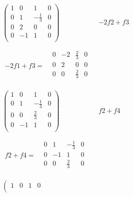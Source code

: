 \[
    \begin{aligned}
        \left(
            \begin{array}{ccc|c}
                1 & 0 & 1 & 0 \\
                0 & 1 & -\frac{1}{3} & 0 \\
                0 & 2 & 0 & 0 \\
                0 & -1 & 1 & 0 \\
            \end{array}
        \right)
        &-2f2+f3 \\ \\
        \begin{aligned}
            -2f1+f3=
            &\begin{array}{ccc|c}
                0 & -2 & \frac{2}{3} & 0 \\
                0 & 2 & 0 & 0 \\
                \hline
                0 & 0 & \frac{2}{3} & 0 \\
            \end{array}
        \end{aligned} \\ \\
        \left(
            \begin{array}{ccc|c}
                1 & 0 & 1 & 0 \\
                0 & 1 & -\frac{1}{3} & 0 \\
                0 & 0 & \frac{2}{3} & 0 \\
                0 & -1 & 1 & 0 \\
            \end{array}
        \right)
        &f2+f4 \\ \\
        \begin{aligned}
            f2+f4=
            &\begin{array}{ccc|c}
                0 & 1 & -\frac{1}{3} & 0 \\
                0 & -1 & 1 & 0 \\
                \hline
                0 & 0 & \frac{2}{3} & 0 \\
            \end{array}
        \end{aligned} \\ \\
        \left(
            \begin{array}{ccc|c}
                1 & 0 & 1 & 0 \\

\end{array}
\end{aligned}\]
